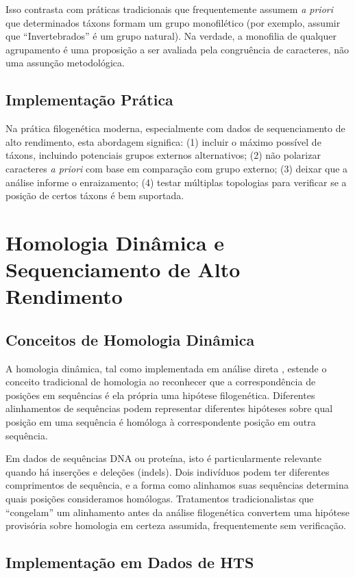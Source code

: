 Isso contrasta com práticas tradicionais que frequentemente assumem \textit{a priori} que determinados táxons formam um grupo monofilético (por exemplo, assumir que ``Invertebrados'' é um grupo natural). Na verdade, a monofilia de qualquer agrupamento é uma proposição a ser avaliada pela congruência de caracteres, não uma assunção metodológica.

\subsection{Implementação Prática}

Na prática filogenética moderna, especialmente com dados de sequenciamento de alto rendimento, esta abordagem significa: (1) incluir o máximo possível de táxons, incluindo potenciais grupos externos alternativos; (2) não polarizar caracteres \textit{a priori} com base em comparação com grupo externo; (3) deixar que a análise informe o enraizamento; (4) testar múltiplas topologias para verificar se a posição de certos táxons é bem suportada.

\section{Homologia Dinâmica e Sequenciamento de Alto Rendimento}

\subsection{Conceitos de Homologia Dinâmica}

A homologia dinâmica, tal como implementada em análise direta \parencite{wheeler1996}, estende o conceito tradicional de homologia ao reconhecer que a correspondência de posições em sequências é ela própria uma hipótese filogenética. Diferentes alinhamentos de sequências podem representar diferentes hipóteses sobre qual posição em uma sequência é homóloga à correspondente posição em outra sequência.

Em dados de sequências DNA ou proteína, isto é particularmente relevante quando há inserções e deleções (indels). Dois indivíduos podem ter diferentes comprimentos de sequência, e a forma como alinhamos suas sequências determina quais posições consideramos homólogas. Tratamentos tradicionalistas que ``congelam'' um alinhamento antes da análise filogenética convertem uma hipótese provisória sobre homologia em certeza assumida, frequentemente sem verificação.

\subsection{Implementação em Dados de HTS}

